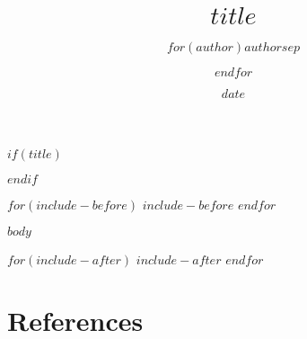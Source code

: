 \documentclass[$mode$]{apa6}
\title{$title$}
\author{$for(author)$$author$$sep$ \and $endfor$}
\date{$date$}
\begin{document}
$if(title)$
\maketitle
$endif$

$for(include-before)$
$include-before$
$endfor$

$body$

$for(include-after)$
$include-after$
$endfor$

\section{References}



\end{document}

